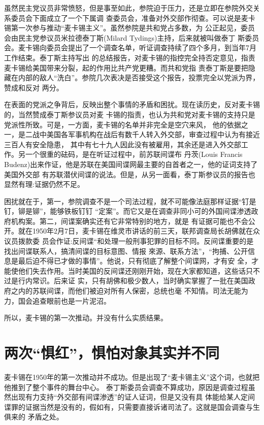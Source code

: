 \documentclass[10pt]{article}
\begin{document}
{虽然民主党议员非常愤怒，但是事至如此，参院迫于压力，还是立即在参院外交关系委员会下面成立了一个下属调
查委员会，准备对外交部作彻查。可以说是麦卡锡第一次参与推动``麦卡锡主义''。虽然参院是共和党占多数，为
公正起见，委员会由民主党参议员米拉德\textperiodcentered 泰丁斯(Milard Tydings)主持，后来就被叫做泰丁
斯委员会。麦卡锡向委员会提出了一个调查名单，听证调查持续了四个多月，到当年7月工作结束。泰丁斯主持写出
的总结报告，对麦卡锡的指控完全持否定意见，指责麦卡锡给美国带来分裂，起的作用比共产党更糟。而共和党指
责泰丁斯是要把隐藏在内部的敌人``洗白''。参院几次表决是否接受这个报告，投票完全以党派为界，赞成和反对
两分。

在表面的党派之争背后，反映出整个事情的矛盾和困扰。现在读历史，反对麦卡锡的，当然赞成泰丁斯参议员对麦
卡锡的指责，也认为共和党对麦卡锡的支持只是党派性所致。可是，一方面，麦卡锡的名单并非完全是空穴来风，
他的依据之一，是二战中美国各军事机构在战后有数千人转入外交部，审查过程中认为有接近三百人有安全隐患，
其中有七十九人因此没有被雇用，其余还是进入外交部工作。另一个很重的砝码，是在听证过程中，前苏联间谍布
丹茨(Louis Francis Budenz)出来作证，他是苏联在美国间谍网最主要的自首者之一，他的证词支持了美国外交部
有苏联潜伏间谍的说法。但是，从另一面看，泰丁斯参议员的报告也显然有理:证据仍然不足。

困扰就在于，第一，参院调查不是一个司法过程，就不可能像法庭那样证据``钉是钉，铆是铆''，能够铁板钉钉
``定案''。而它又是在调查非同小可的外国间谍渗透政府机构案。第二，间谍案确实还有它非常特别的地方，就是
有证据可能也不会公开。就在1950年2月7日，麦卡锡在维灵市讲话的前三天，联邦调查局长胡佛就在众议员拨款委
员会作证:反间谍``和处理一般刑事犯罪的目标不同。反间谍重要的是找出间谍联系人，搞清间谍的目标意图、情报
來源、联系方法''，``拘捕、公开信息是最后迫不得已才做的事情''。他说，只有彻底了解整个间谍网，才有安
全，才能使他们失去作用。当时美国的反间谍还刚刚开始，现在大家都知道，这些话只不过是行内常识。后来证
实，只有胡佛和极少数人，当时确实掌握了一批在美国政府之内的苏联间谍，而他们被迫对所有人保密，总统也毫
不知情。司法无能为力，国会追查眼前也是一片泥沼。

所以，麦卡锡的第一次推动。并没有什么实质结果。

\pagebreak
\section{两次``惧红''，惧怕对象其实并不同}

麦卡锡在1950年的第一次推动并不成功。但是出现了``麦卡锡主义''这个词，也就把他推到了整个事件的舞台中心。
泰丁斯委员会调查不算成功，原因是调查过程虽然出现有力支持``外交部有间谍渗透''的证人证词，但是又没有具
体能给某人定间谍罪的证据\myrule 当然是没有的，假如有，只需要直接诉诸司法了。这就是国会调查与生俱来的
矛盾之处。

}
\end{document}
